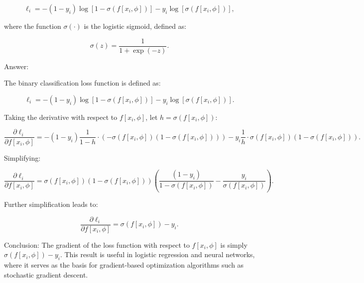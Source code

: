 \documentclass[10pt]{article}
\begin{document}
\begin{equation}
\ell_i = -(1 - y_i) \log [1 - \sigma(f[x_i, \phi])] - y_i \log [\sigma(f[x_i, \phi])],
\end{equation}

where the function \( \sigma(\cdot) \) is the logistic sigmoid, defined as:

\begin{equation}
\sigma(z) = \frac{1}{1 + \exp(-z)}.
\end{equation}

\vspace{5em}

\noindent  Answer: 


The binary classification loss function is defined as:

\begin{equation}
    \ell_i = -(1 - y_i) \log [1 - \sigma(f[x_i, \phi])] - y_i \log [\sigma(f[x_i, \phi])].
\end{equation}

Taking the derivative with respect to $f[x_i, \phi]$, let $h = \sigma(f[x_i, \phi])$:

\begin{equation}
    \frac{\partial \ell_i}{\partial f[x_i, \phi]} = - (1 - y_i) \frac{1}{1 - h} \cdot (-\sigma(f[x_i, \phi])(1 - \sigma(f[x_i, \phi])) ) - y_i \frac{1}{h} \cdot \sigma(f[x_i, \phi])(1 - \sigma(f[x_i, \phi])).
\end{equation}

Simplifying:

\begin{equation}
    \frac{\partial \ell_i}{\partial f[x_i, \phi]} = \sigma(f[x_i, \phi]) (1 - \sigma(f[x_i, \phi])) \left( \frac{(1 - y_i)}{1 - \sigma(f[x_i, \phi])} - \frac{y_i}{\sigma(f[x_i, \phi])} \right).
\end{equation}

Further simplification leads to:

\begin{equation}
    \frac{\partial \ell_i}{\partial f[x_i, \phi]} = \sigma(f[x_i, \phi]) - y_i.
\end{equation}

Conclusion: The gradient of the loss function with respect to $f[x_i, \phi]$ is simply $\sigma(f[x_i, \phi]) - y_i$. This result is useful in logistic regression and neural networks, where it serves as the basis for gradient-based optimization algorithms such as stochastic gradient descent.
\end{document}
